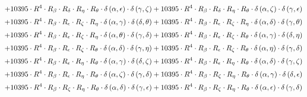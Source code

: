 \begin{subequations}
\begin{gather}
 \\[0.2em] \notag 		 + 10395 \cdot R^{4} \cdot R_{\beta{}} \cdot R_{\delta{}} \cdot R_{\eta{}} \cdot R_{\theta{}} \cdot \delta{}\left(\alpha{}, \epsilon{}\right) \cdot \delta{}\left(\gamma{}, \zeta{}\right)+ 10395 \cdot R^{4} \cdot R_{\beta{}} \cdot R_{\delta{}} \cdot R_{\eta{}} \cdot R_{\theta{}} \cdot \delta{}\left(\alpha{}, \zeta{}\right) \cdot \delta{}\left(\gamma{}, \epsilon{}\right) 
 \\[0.2em] \notag 		 + 10395 \cdot R^{4} \cdot R_{\beta{}} \cdot R_{\epsilon{}} \cdot R_{\zeta{}} \cdot R_{\eta{}} \cdot \delta{}\left(\alpha{}, \gamma{}\right) \cdot \delta{}\left(\delta{}, \theta{}\right)+ 10395 \cdot R^{4} \cdot R_{\beta{}} \cdot R_{\epsilon{}} \cdot R_{\zeta{}} \cdot R_{\eta{}} \cdot \delta{}\left(\alpha{}, \delta{}\right) \cdot \delta{}\left(\gamma{}, \theta{}\right) 
 \\[0.2em] \notag 		 + 10395 \cdot R^{4} \cdot R_{\beta{}} \cdot R_{\epsilon{}} \cdot R_{\zeta{}} \cdot R_{\eta{}} \cdot \delta{}\left(\alpha{}, \theta{}\right) \cdot \delta{}\left(\gamma{}, \delta{}\right)+ 10395 \cdot R^{4} \cdot R_{\beta{}} \cdot R_{\epsilon{}} \cdot R_{\zeta{}} \cdot R_{\theta{}} \cdot \delta{}\left(\alpha{}, \gamma{}\right) \cdot \delta{}\left(\delta{}, \eta{}\right) 
 \\[0.2em] \notag 		 + 10395 \cdot R^{4} \cdot R_{\beta{}} \cdot R_{\epsilon{}} \cdot R_{\zeta{}} \cdot R_{\theta{}} \cdot \delta{}\left(\alpha{}, \delta{}\right) \cdot \delta{}\left(\gamma{}, \eta{}\right)+ 10395 \cdot R^{4} \cdot R_{\beta{}} \cdot R_{\epsilon{}} \cdot R_{\zeta{}} \cdot R_{\theta{}} \cdot \delta{}\left(\alpha{}, \eta{}\right) \cdot \delta{}\left(\gamma{}, \delta{}\right) 
 \\[0.2em] \notag 		 + 10395 \cdot R^{4} \cdot R_{\beta{}} \cdot R_{\epsilon{}} \cdot R_{\eta{}} \cdot R_{\theta{}} \cdot \delta{}\left(\alpha{}, \gamma{}\right) \cdot \delta{}\left(\delta{}, \zeta{}\right)+ 10395 \cdot R^{4} \cdot R_{\beta{}} \cdot R_{\epsilon{}} \cdot R_{\eta{}} \cdot R_{\theta{}} \cdot \delta{}\left(\alpha{}, \delta{}\right) \cdot \delta{}\left(\gamma{}, \zeta{}\right) 
 \\[0.2em] \notag 		 + 10395 \cdot R^{4} \cdot R_{\beta{}} \cdot R_{\epsilon{}} \cdot R_{\eta{}} \cdot R_{\theta{}} \cdot \delta{}\left(\alpha{}, \zeta{}\right) \cdot \delta{}\left(\gamma{}, \delta{}\right)+ 10395 \cdot R^{4} \cdot R_{\beta{}} \cdot R_{\zeta{}} \cdot R_{\eta{}} \cdot R_{\theta{}} \cdot \delta{}\left(\alpha{}, \gamma{}\right) \cdot \delta{}\left(\delta{}, \epsilon{}\right) 
 \\[0.2em] \notag 		 + 10395 \cdot R^{4} \cdot R_{\beta{}} \cdot R_{\zeta{}} \cdot R_{\eta{}} \cdot R_{\theta{}} \cdot \delta{}\left(\alpha{}, \delta{}\right) \cdot \delta{}\left(\gamma{}, \epsilon{}\right)+ 10395 \cdot R^{4} \cdot R_{\beta{}} \cdot R_{\zeta{}} \cdot R_{\eta{}} \cdot R_{\theta{}} \cdot \delta{}\left(\alpha{}, \epsilon{}\right) \cdot \delta{}\left(\gamma{}, \delta{}\right) 

\end{gather}
\end{subequations}
